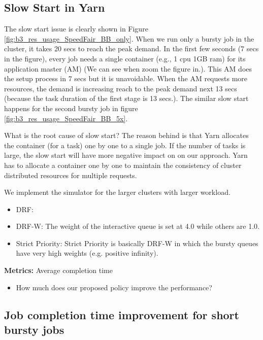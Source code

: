 \subsection{Slow Start in Yarn}

The slow start issue is clearly shown in Figure \ref{fig:b3_res_usage_SpeedFair_BB_only}. When we run only a bursty job in the cluster, it takes 20 secs to reach the peak demand. In the first few seconds (7 secs in the figure), every job needs a single container (e.g., 1 cpu 1GB ram) for its application master (AM) (We can see when zoom the figure in.). This AM does the setup process in 7 secs but it is unavoidable. When the AM requests more resources, the demand is increasing reach to the peak demand next 13 secs (because the task duration of the first stage is 13 secs.). The similar slow start happens for the second bursty job in figure \ref{fig:b3_res_usage_SpeedFair_BB_5x}.

What is the root cause of slow start? The reason behind is that Yarn allocates the container (for a task) one by one to a single job. If the number of tasks is large, the slow start will have more negative impact on on our approach. Yarn has to allocate a container one by one to maintain the consistency of cluster distributed resources for multiple requests.

We implement the simulator for the larger clusters with larger workload.

\begin{itemize}
	\item DRF: 
	\item DRF-W: The weight of the interactive queue is set at 4.0 while others are 1.0.
	\item Strict Priority: Strict Priority is basically DRF-W in which the bursty queues have very high weights (e.g. positive infinity).
\end{itemize}


\noindent \textbf{Metrics:} Average completion time

\begin{itemize}
	\item How much does our proposed policy improve the performance?
\end{itemize}

\subsection{Job completion time improvement for short bursty jobs }



